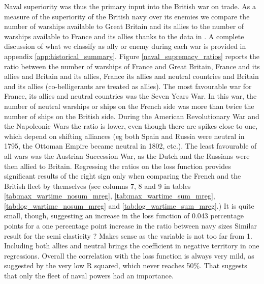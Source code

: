 \documentclass[12pt,a4paper,notitlepage,english]{article}
\begin{document}
Naval superiority was thus the primary input into the British war on trade.
As a measure of the superiority of the British navy over its enemies we compare the number of warships available to Great Britain and its allies to the number of warships available to France and its allies thanks to the data in \cite{Modelski1988}.
A complete discussion of what we classify as ally or enemy during each war is provided in appendix \ref{app:historical_summary}.
Figure \ref{naval_supremacy_ratios} reports the ratio between the number of warships of France and Great Britain, France and its allies and Britain and its allies, France its allies and neutral countries and Britain and its allies (co-belligerants are treated as allies).
The most favourable war for France, its allies and neutral countries was the Seven Years War.
In this war, the number of neutral warships or ships on the French side was more than twice the number of ships on the British side.
During the American Revolutionary War and the Napoleonic Wars the ratio is lower, even though there are spikes close to one, which depend on shifting alliances (eg both Spain and Russia were neutral in 1795, the Ottoman Empire became neutral in 1802, etc.). 
The least favourable of all wars was the Austrian Succession War, as the Dutch and the Russians were then allied to Britain.  
Regressing the ratios on the loss function provides significant results of the right sign only when comparing the French and the British fleet by themselves (see columns 7, 8 and 9 in tables  \ref{tab:max_wartime_nosum_mreg},  \ref{tab:max_wartime_sum_mreg}, \ref{tab:log_wartime_nosum_mreg} and   \ref{tab:log_wartime_sum_mreg}.) It is quite small, though, suggesting an increase in the loss function of 0.043 percentage points for a one percentage point increase in the ratio between navy sizes
Similar result for the semi elasticity ? Makes sense as the variable is not too far from 1. 
Including both allies and neutral brings the coefficient in negative territory in one regressions.
 Overall the correlation with the loss function is always very mild, as suggested by the very low R squared, which never reaches 50\%. 
 That suggests that only the fleet of naval powers had an importance.
 
\end{document}
